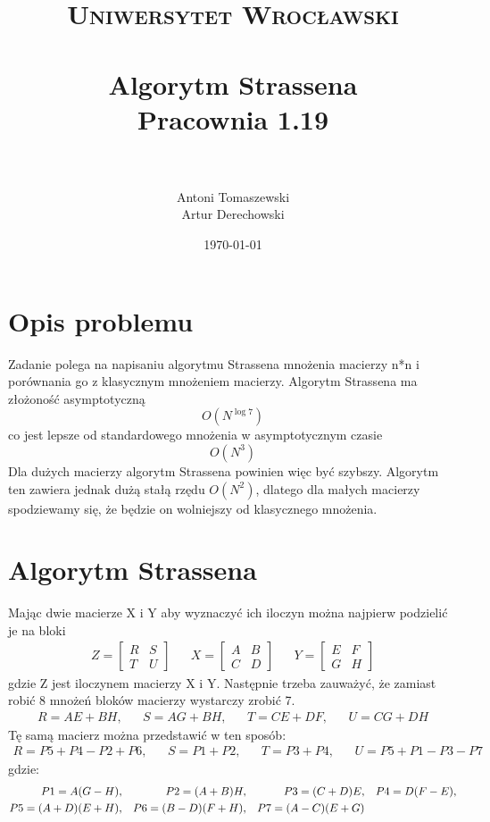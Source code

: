 \documentclass[paper=a4, fontsize=11pt]{scrartcl} %
\title{	
\normalfont \normalsize 
\textsc{Uniwersytet Wrocławski} \\ [25pt] %
\horrule{0.5pt} \\[0.4cm] %
\huge Algorytm Strassena \\
\large Pracownia 1.19 \\ %
\horrule{2pt} \\[0.5cm] %
}
\author{Antoni Tomaszewski \\ Artur Derechowski} %
\date{\normalsize\today} %
\numberwithin{equation}{section} %
\numberwithin{figure}{section} %
\numberwithin{table}{section} %
\begin{document}
\maketitle %


\section{Opis problemu}

Zadanie polega na napisaniu algorytmu Strassena mnożenia macierzy n*n  i porównania go z klasycznym mnożeniem macierzy. Algorytm Strassena ma złożoność asymptotyczną 
\[ O(N^{\log 7 } )\]
co jest lepsze od standardowego mnożenia w asymptotycznym czasie \[ O(N^{3} )\] Dla dużych macierzy algorytm Strassena powinien więc być szybszy. Algorytm ten zawiera jednak dużą stałą
rzędu $O(N^2)$, dlatego dla małych macierzy spodziewamy się, że będzie on wolniejszy od klasycznego mnożenia.

\section{Algorytm Strassena}

Mając dwie macierze X i Y aby wyznaczyć ich iloczyn można najpierw podzielić je na bloki
\begin{align}
Z = 
\begin{bmatrix}
R & S \\
T & U
\end{bmatrix} &&
X = 
\begin{bmatrix}
A & B \\
C & D
\end{bmatrix} &&
Y = 
\begin{bmatrix}
E & F \\
G & H
\end{bmatrix}
\end{align}
gdzie Z jest iloczynem macierzy X i Y. Następnie trzeba zauważyć, że zamiast robić 8 mnożeń bloków macierzy wystarczy zrobić 7.\\
\begin{align}
R = AE + BH, && S = AG + BH, && T = CE + DF, && U = CG + DH
\end{align}
Tę samą macierz można przedstawić w ten sposób:\\
\begin{align}
R = P5 + P4 - P2 + P6, && S = P1 + P2, && T = P3 + P4, && U = P5 + P1 - P3 - P7
\end{align}
gdzie:\\
\begin{align}
P1 = A(G - H), && P2 = (A + B)H, && P3 = (C + D)E, && P4 = D(F - E), \notag\\
P5 = (A + D)(E + H), && P6 = (B - D)(F + H), && P7 = (A - C)(E + G)
\end{align}
\end{document}
